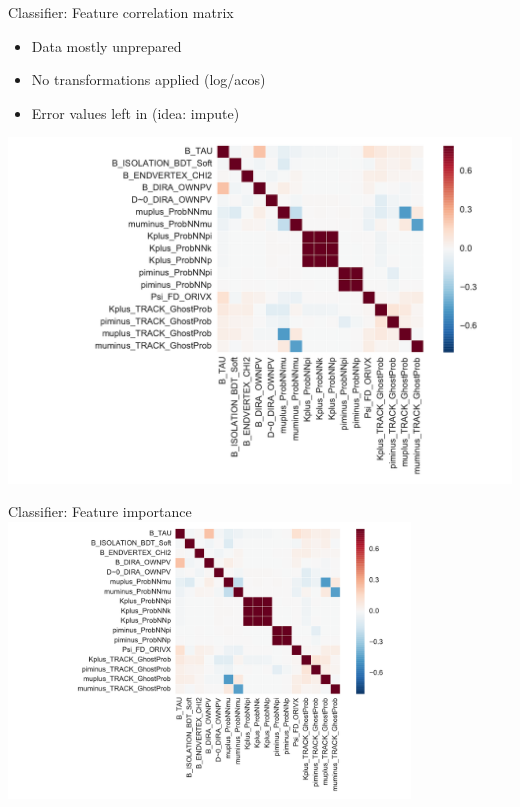 \documentclass[compress,aspectratio=1610]{beamer}
\begin{document}
\begin{frame}{Classifier: Feature correlation matrix}
  \begin{minipage}{0.29\textwidth}
    \begin{itemize}
      \item Data mostly unprepared
      \item No transformations applied (log/acos)
      \item Error values left in (idea: impute)
    \end{itemize}
  \end{minipage}
  \begin{minipage}{0.7\textwidth}
    \centering
    \includegraphics[page=1,width=\textwidth,trim=3cm 0cm 0cm 0cm,clip]{./figures/classifier.pdf}
  \end{minipage}
\end{frame}

\begin{frame}{Classifier: Feature importance}
  \centering
  \includegraphics[page=4,width=0.8\textwidth]{./figures/classifier.pdf}
\end{frame}
\end{document}

